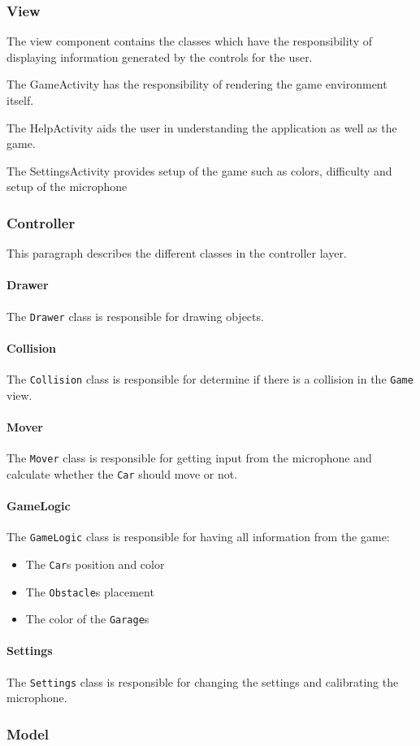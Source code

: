 \subsubsection{View}
The view component contains the classes which have the responsibility of displaying information generated by the controls for the user.

The GameActivity has the responsibility of rendering the game environment itself. 

The HelpActivity aids the user in understanding the application as well as the game. 

The SettingsActivity provides setup of the game such as colors, difficulty and setup of the microphone

\subsubsection{Controller}
This paragraph describes the different classes in the controller layer.
\paragraph{Drawer}
The \lstinline!Drawer! class is responsible for drawing objects.
\paragraph{Collision}
The \lstinline!Collision! class is responsible for determine if there is a collision in the \lstinline!Game! view.
\paragraph{Mover}
The \lstinline!Mover! class is responsible for getting input from the microphone and calculate whether the \lstinline!Car! should move or not.
\paragraph{GameLogic}
The \lstinline!GameLogic! class is responsible for having all information from the game:
\begin{itemize}
\item The \lstinline!Car!s position and color
\item The \lstinline!Obstacle!s placement
\item The color of the \lstinline!Garage!s
\end{itemize}
\paragraph{Settings}
The \lstinline!Settings! class is responsible for changing the settings and calibrating the microphone.
\subsubsection{Model}
